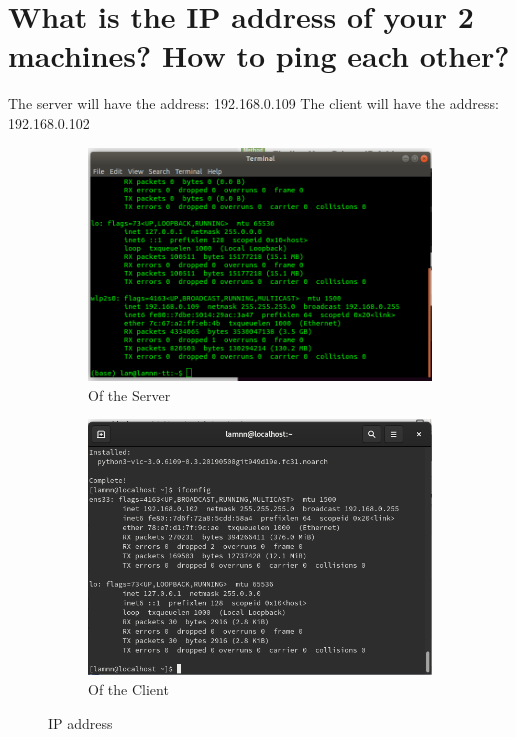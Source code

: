\documentclass[11pt,a4paper]{report}
\begin{document}
	\section{What is the IP address of your 2 machines? How to ping each other?}
	The server will have the address: 192.168.0.109
	The client will have the address: 192.168.0.102
	\begin{figure}[h!]
		\centering
  		\begin{subfigure}[b]{0.4\linewidth}
  		\includegraphics[width=\linewidth]{ip-server.png}
    		\caption{Of the Server}
  		\end{subfigure}
  		\begin{subfigure}[b]{0.4\linewidth}
    		\includegraphics[width=\linewidth]{ip-client.png}
    		\caption{Of the Client}
  		\end{subfigure}
  		\caption{IP address}
  		\label{fig:addr}
	\end{figure}
\end{document}
